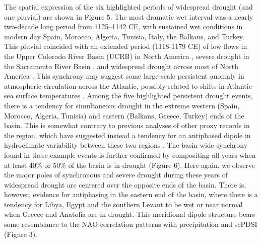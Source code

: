 \documentclass[draft,jgr]{AGUTeX}
\begin{document}
\begin{article}
\indent The spatial expression of the six highlighted periods of widespread drought (and one pluvial) are shown in Figure 5. The most dramatic wet interval was a nearly two-decade long period from 1125--1142 CE, with sustained wet conditions in modern day Spain, Morocco, Algeria, Tunisia, Italy, the Balkans, and Turkey. This pluvial coincided with an extended period (1118-1179 CE) of low flows in the Upper Colorado River Basin (UCRB) in North America \citep[the most persistent dry period in that region over the last millennium;][]{Meko:etal2007a}, severe drought in the Sacramento River Basin \citep{Meko2012}, and widespread drought across most of North America \citep{Cook2014}. This synchrony may suggest some large-scale persistent anomaly in atmospheric circulation across the Atlantic, possibly related to shifts in Atlantic sea surface temperatures \citep{Hu2012}. Among the five highlighted persistent drought events, there is a tendency for simultaneous drought in the extreme western (Spain, Morocco, Algeria, Tunisia) and eastern (Balkans, Greece, Turkey) ends of the basin. This is somewhat contrary to previous analyses of other proxy records in the region, which have suggested instead a tendency for an antiphased dipole in hydroclimate variability between these two regions \citep[e.g.,][]{Roberts:etal2012}. The basin-wide synchrony found in these example events is further confirmed by compositing all years when at least 40\% or 50\% of the basin is in drought (Figure 6). Here again, we observe the major poles of synchronous and severe drought during these years of widespread drought are centered over the opposite ends of the basin. There is, however, evidence for antiphasing in the eastern end of the basin, where there is a tendency for Libya, Egypt and the southern Levant to be wet or near normal when Greece and Anatolia are in drought. This meridional dipole structure bears some resemblance to the NAO correlation patterns with precipitation and scPDSI (Figure 3).


\end{article}
\end{document}
